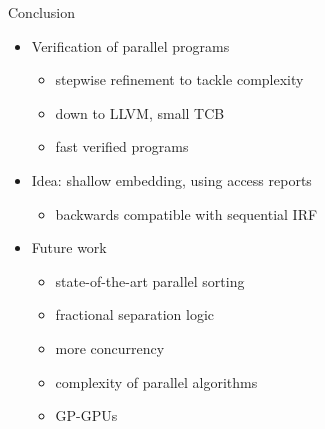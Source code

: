 \documentclass[fleqn]{beamer}
\newcommand{\high}[1]{{\color{blue}#1}}
\begin{document}
{

\begin{frame}{Conclusion}
  \begin{itemize}
   \item Verification of parallel programs
    \begin{itemize}
     \item stepwise refinement to tackle complexity
     \item down to LLVM, small TCB
     \item \high{fast} verified programs

    \end{itemize}
   \item Idea: shallow embedding, using access reports
    \begin{itemize}
     \item backwards compatible with sequential IRF

    \end{itemize}
   \item Future work
    \begin{itemize}
     \item state-of-the-art parallel sorting
     \item fractional separation logic
     \item more concurrency
     \item complexity of parallel algorithms
     \item GP-GPUs

    \end{itemize}
  \end{itemize}
\end{frame}
}
\end{document}
